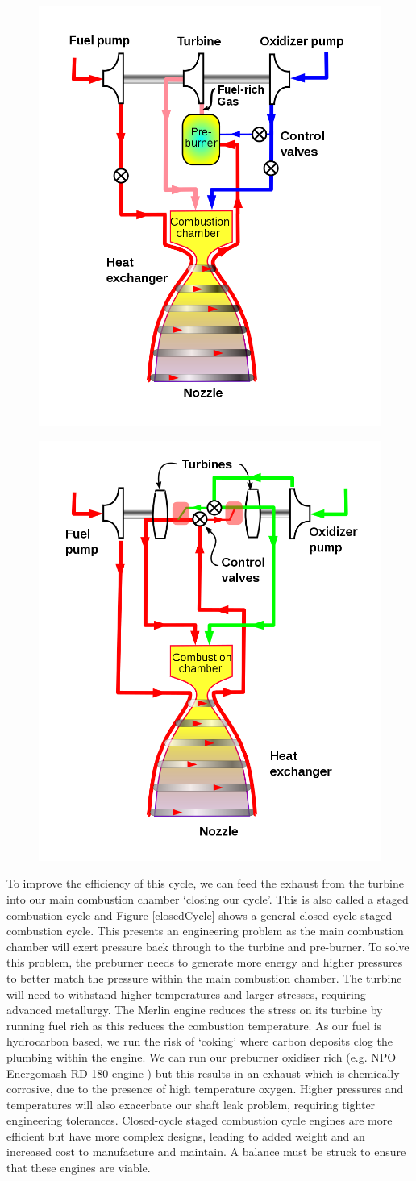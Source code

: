 \documentclass[11pt]{article}
\numberwithin{equation}{section}
\begin{document}
\begin{figure}[H]
    \centering
    \begin{minipage}{.5\textwidth}
        \centering
        \includegraphics[height = 30ex]{./img/closedCycle.png}
        \label{closedCycle}
    \end{minipage}%
    \begin{minipage}{.5\textwidth}
        \centering
        \includegraphics[height = 30ex]{./img/fullFlowCycle.png}
        \label{fullFlow}
    \end{minipage}
\end{figure}

To improve the efficiency of this cycle, we can feed the exhaust from the turbine into our main combustion chamber `closing our cycle'. This is also called a staged combustion cycle and Figure \ref{closedCycle} shows a general closed-cycle staged combustion cycle. This presents an engineering problem as the main combustion chamber will exert pressure back through to the turbine and pre-burner. To solve this problem, the preburner needs to generate more energy and higher pressures to better match the pressure within the main combustion chamber. The turbine will need to withstand higher temperatures and larger stresses, requiring advanced metallurgy. The Merlin engine reduces the stress on its turbine by running fuel rich as this reduces the combustion temperature. As our fuel is hydrocarbon based, we run the risk of `coking' where carbon deposits clog the plumbing within the engine. We can run our preburner oxidiser rich (e.g. NPO Energomash RD-180 engine \cite{b6}) but this results in an exhaust which is chemically corrosive, due to the presence of high temperature oxygen. Higher pressures and temperatures will also exacerbate our shaft leak problem, requiring tighter engineering tolerances. Closed-cycle staged combustion cycle engines are more efficient but have more complex designs, leading to added weight and an increased cost to manufacture and maintain. A balance must be struck to ensure that these engines are viable.
\end{document}
